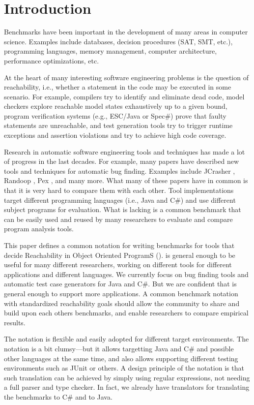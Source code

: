 \section{Introduction}

Benchmarks have been important in the development of many areas in computer science.
Examples include databases, decision procedures (SAT, SMT, etc.), 
programming languages, memory management, computer architecture,
performance optimizations, etc.

At the heart of many interesting software engineering problems is the question of
reachability, i.e., whether a statement in the code may be executed in some scenario.
For example, compilers try to identify and eliminate dead code,
model checkers explore reachable model states exhaustively up to a given bound,
program verification systems (e.g., ESC/Java or Spec\#) prove that faulty statements are unreachable,
and test generation tools try to trigger runtime exceptions and assertion violations
and try to achieve high code coverage.

Research in automatic software engineering tools and techniques has made a lot 
of progress in the last decades. For example, many papers have described new tools
and techniques for automatic bug finding. Examples include JCrasher \cite{csallner04jcrasher}, 
Randoop \cite{}, Pex \cite{tillmann08pex}, and many more. What many of these papers have in 
common is that it is very hard to compare them with each other. Tool implementations
target different programming languages (i.e., Java and C\#) and use different
subject programs for evaluation. What is lacking is a common benchmark that
can be easily used and reused by many researchers to evaluate and compare
program analysis tools.

This paper defines a common notation for writing benchmarks for tools 
that decide Reachability in Object Oriented ProgramS ().
 is general enough to be useful for many different researchers,
working on different tools for different applications and different languages.
We currently focus on bug finding tools and automatic test case generators
for Java and C\#. But we are confident that  is general enough to 
support more applications.
A common benchmark notation with standardized reachability goals should allow 
the community to share and build upon each others benchmarks, and enable
researchers to compare empirical results.

The  notation is flexible and easily adopted for different target 
environments. The notation is a bit clumsy---but it allows targetting Java 
and C\# and possible other languages at the same time, and also allows supporting different testing 
environments such as JUnit or others. A design principle of the  
notation is that such translation can be achieved by simply using regular 
expressions, not needing a full parser and type checker. In fact, we
already have translators for translating the  benchmarks to C\#
and to Java.

